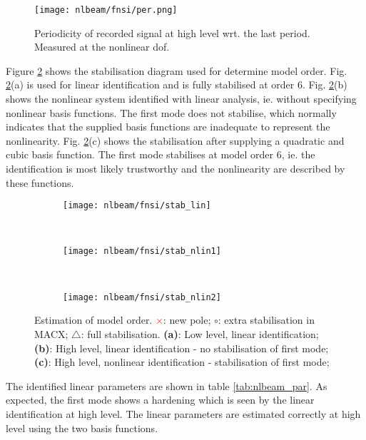 \begin{figure}[!ht]
  \centering
  \texttt{[image: nlbeam/fnsi/per.png]}
  \caption{Periodicity of recorded signal at high level wrt. the last period.
    Measured at the nonlinear dof.}
  \label{fig:nlbeam_per}
\end{figure}

Figure \ref{fig:nlbeam_stab} shows the stabilisation diagram used for determine
model order. Fig. \ref{fig:nlbeam_stab}(a) is used for linear identification and
is fully stabilised at order 6. Fig. \ref{fig:nlbeam_stab}(b) shows the
nonlinear system identified with linear analysis, ie. without specifying
nonlinear basis functions. The first mode does not stabilise, which normally
indicates that the supplied basis functions are inadequate to represent the
nonlinearity. Fig. \ref{fig:nlbeam_stab}(c) shows the stabilisation after
supplying a quadratic and cubic basis function. The first mode stabilises at
model order 6, ie. the identification is most likely trustworthy and the
nonlinearity are described by these functions.

\begin{figure}
  \centering
    \begin{subfigure}[b]{0.45\textwidth}
      \texttt{[image: nlbeam/fnsi/stab\_lin]}
      \caption{}
    \end{subfigure}
    ~
    \begin{subfigure}[b]{0.45\textwidth}
      \texttt{[image: nlbeam/fnsi/stab\_nlin1]}
      \caption{}
    \end{subfigure}
    \\
    \begin{subfigure}[b]{0.45\textwidth}
      \texttt{[image: nlbeam/fnsi/stab\_nlin2]}
      \caption{}
    \end{subfigure}
    \caption{Estimation of model order.
    \textcolor{red}{$\pmb\times$}: new pole;
    $\pmb\circ$: extra stabilisation in MACX;
    $\pmb\triangle$: full stabilisation.
    \textbf{(a)}: Low level, linear identification;
    \textbf{(b)}: High level, linear identification - no stabilisation of first mode;
    \textbf{(c)}: High level, nonlinear identification - stabilisation of first mode;
  }
  \label{fig:nlbeam_stab}
\end{figure}

The identified linear parameters are shown in table \ref{tab:nlbeam_par}. As
expected, the first mode shows a hardening which is seen by the linear
identification at high level. The linear parameters are estimated correctly at
high level using the two basis functions.

